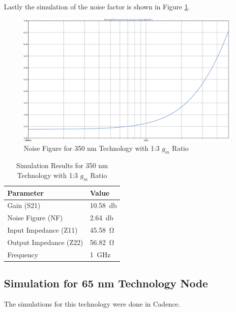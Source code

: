 Lastly the simulation of the noise factor is shown in Figure \ref{fig:350nm_1ton-NF}.
\begin{figure}[H]
    \centering
    \includegraphics[width=1\textwidth]{Images/3501to3Noise.png}
    \caption{Noise Figure for 350 nm Technology with 1:3 $g_m$ Ratio}
    \label{fig:350nm_1ton-NF}
\end{figure}

\begin{table}[H]
    \centering
    \caption{Simulation Results for 350 nm Technology with 1:3 $g_m$ Ratio}
    \begin{tabularx}{\textwidth}{>{\centering\arraybackslash}X >{\centering\arraybackslash}X }
        \toprule
        \textbf{Parameter} & \textbf{Value}\\
        \midrule
        Gain (S21) & \SI{10.58}{\decibel} \\
        \midrule
        Noise Figure (NF) & \SI{2.64}{\decibel} \\
        \midrule
        Input Impedance (Z11) & \SI{45.58}{\ohm} \\
        \midrule
        Output Impedance (Z22) & \SI{56.82}{\ohm} \\
        \midrule
        Frequency & \SI{1}{\giga \hertz} \\
        \bottomrule
    \end{tabularx}
    \label{tab:350nm_1ton_results}
\end{table}

\subsection{Simulation for 65 nm Technology Node}

The simulations for this technology were done in Cadence. 

